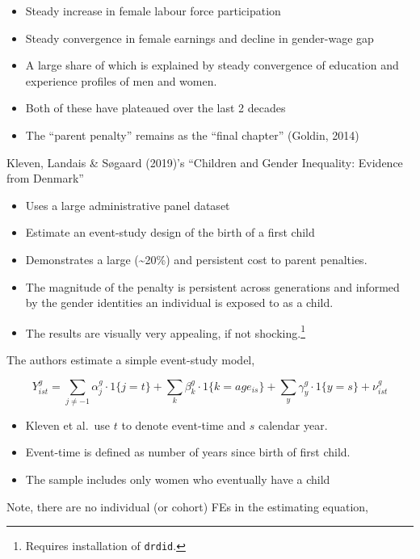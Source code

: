 \documentclass[
  letterpaper,
  DIV=11,
  numbers=noendperiod]{scrreprt}
\providecommand{\tightlist}{%
  \setlength{\itemsep}{0pt}\setlength{\parskip}{0pt}}\usepackage{longtable,booktabs,array}
\theoremstyle{definition}
\theoremstyle{remark}
\begin{document}
\begin{itemize}
\tightlist
\item
  Steady increase in female labour force participation
\item
  Steady convergence in female earnings and decline in gender-wage gap
\item
  A large share of which is explained by steady convergence of education
  and experience profiles of men and women.
\item
  Both of these have plateaued over the last 2 decades
\item
  The ``parent penalty'' remains as the ``final chapter'' (Goldin, 2014)
\end{itemize}

Kleven, Landais \& Søgaard (2019)'s ``Children and Gender Inequality:
Evidence from Denmark''

\begin{itemize}
\tightlist
\item
  Uses a large administrative panel dataset
\item
  Estimate an event-study design of the birth of a first child
\item
  Demonstrates a large (\textasciitilde20\%) and persistent cost to
  parent penalties.
\item
  The magnitude of the penalty is persistent across generations and
  informed by the gender identities an individual is exposed to as a
  child.
\item
  The results are visually very appealing, if not shocking.\footnote{Requires
    installation of \texttt{drdid}.}
\end{itemize}

The authors estimate a simple event-study model,

\[
Y^g_{ist} = \sum_{j\neq-1}\alpha^g_j\cdot1\{j=t\}+\sum_{k}\beta^g_k\cdot1\{k=age_{is}\}+\sum_y\gamma^g_y\cdot1\{y=s\}+\nu^g_{ist}
\]

\begin{itemize}
\tightlist
\item
  Kleven et al.~use \(t\) to denote event-time and \(s\) calendar year.
\item
  Event-time is defined as number of years since birth of first child.
\item
  The sample includes only women who eventually have a child
\end{itemize}

Note, there are no individual (or cohort) FEs in the estimating
equation,
\end{document}
